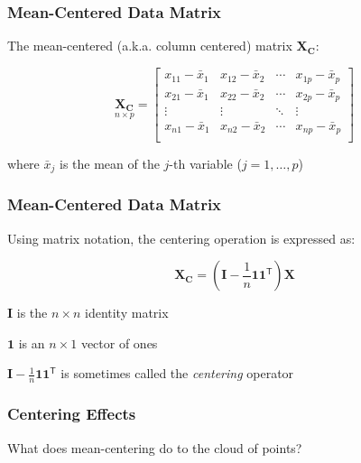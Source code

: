 \documentclass[12pt]{beamer}\usepackage[]{graphicx}\usepackage[]{color}
\begin{document}
\begin{frame}
\frametitle{Mean-Centered Data Matrix}

The mean-centered (a.k.a. column centered) matrix $\mathbf{X_C}$:

\[ \underset{n \times p}{\mathbf{X_C}} = 
\left[\begin{array}{cccc}
x_{11} - \bar{x}_1 & x_{12} - \bar{x}_2 & \cdots & x_{1p} - \bar{x}_p \\
x_{21} - \bar{x}_1 & x_{22} - \bar{x}_2 & \cdots & x_{2p} - \bar{x}_p \\
\vdots & \vdots & \ddots & \vdots \\
x_{n1} - \bar{x}_1 & x_{n2} - \bar{x}_2 & \cdots & x_{np} - \bar{x}_p \\
\end{array}\right]
\]

where $\bar{x}_j$ is the mean of the $j$-th variable ($j = 1, \dots, p$)

\end{frame}


\begin{frame}
\frametitle{Mean-Centered Data Matrix}

Using matrix notation, the centering operation is expressed as:

$$
\mathbf{X_C} = (\mathbf{I} - \frac{1}{n} \mathbf{11^\mathsf{T}}) \mathbf{X} 
$$

\bi
  \item $\mathbf{I}$ is the $n \times n$ identity matrix
  \item $\mathbf{1}$ is an $n \times 1$ vector of ones
\ei

\bigskip
{\mdlit $\mathbf{I} - \frac{1}{n} \mathbf{11^\mathsf{T}}$} is sometimes called the 
{\mdlit \textit{centering}} operator

\end{frame}


\begin{frame}
\frametitle{Centering Effects}

{\large What does mean-centering do to the cloud of points?}

\end{frame}

\end{document}
